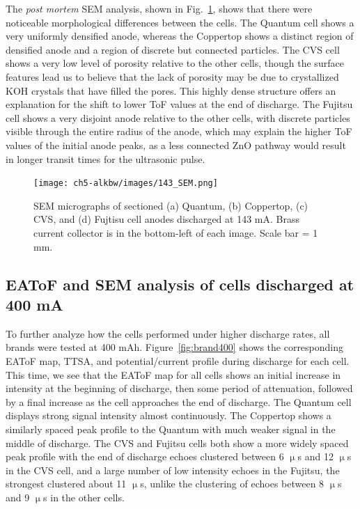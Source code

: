 The \textit{post mortem} SEM analysis, shown in Fig.~\ref{fig:143sem}, shows that there were noticeable morphological differences between the cells. The Quantum cell shows a very uniformly densified anode, whereas the Coppertop shows a distinct region of densified anode and a region of discrete but connected particles. The CVS cell shows a very low level of porosity relative to the other cells, though the surface features lead us to believe that the lack of porosity may be due to crystallized KOH crystals that have filled the pores. This highly dense structure offers an explanation for the shift to lower ToF values at the end of discharge. The Fujitsu cell shows a very disjoint anode relative to the other cells, with discrete particles visible through the entire radius of the anode, which may explain the higher ToF values of the initial anode peaks, as a less connected ZnO pathway would result in longer transit times for the ultrasonic pulse.


\begin{figure}[htb]
  \centering
    \texttt{[image: ch5-alkbw/images/143\_SEM.png]}
    \caption[SEM micrographs of multiple brands of alkaline AA anodes after discharge at 143 mA.]{SEM micrographs of sectioned (a) Quantum, (b) Coppertop, (c) CVS, and (d) Fujtisu cell anodes discharged at 143 mA. Brass current collector is in the bottom-left of each image. Scale bar = 1 mm.}
    \label{fig:143sem}
\end{figure}

\clearpage

\subsection{EAToF and SEM analysis of cells discharged at 400 mA}

To further analyze how the cells performed under higher discharge rates, all brands were tested at 400 mAh. Figure~\ref{fig:brand400} shows the corresponding EAToF map, TTSA, and potential/current profile during discharge for each cell. This time, we see that the EAToF map for all cells shows an initial increase in intensity at the beginning of discharge, then some period of attenuation, followed by a final increase as the cell approaches the end of discharge. The Quantum cell displays strong signal intensity almost continuously. The Coppertop shows a similarly spaced peak profile to the Quantum with much weaker signal in the middle of discharge. The CVS and Fujitsu cells both show a more widely spaced peak profile with the end of discharge echoes clustered between 6 $\upmu$s and 12 $\upmu$s in the CVS cell, and a large number of low intensity echoes in the Fujitsu, the strongest clustered about 11 $\upmu$s, unlike the clustering of echoes between 8 $\upmu$s and 9 $\upmu$s in the other cells. 

